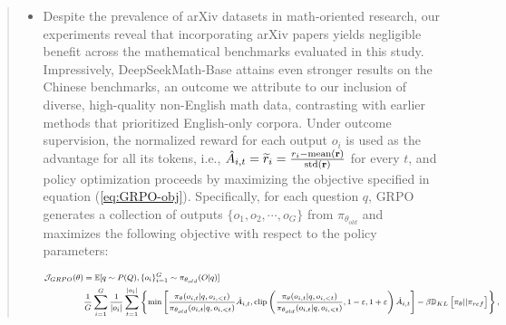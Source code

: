 \begin{abstract}
\begin{itemize}[topsep=0pt]
\begin{itemize}[topsep=0pt]
\subsubsection{Towards a Unified Framework} This section proposes a common framework for comparing various training approaches—including SFT, RFT, DPO, PPO, and GRPO—and presents empirical findings on critical factors shaping this framework. \item Despite the prevalence of arXiv datasets in math-oriented research, our experiments reveal that incorporating arXiv papers yields negligible benefit across the mathematical benchmarks evaluated in this study. Impressively, DeepSeekMath-Base attains even stronger results on the Chinese benchmarks, an outcome we attribute to our inclusion of diverse, high-quality non-English math data, contrasting with earlier methods \citep{minerva,llemma} that prioritized English-only corpora. Under outcome supervision, the normalized reward for each output $o_i$ is used as the advantage for all its tokens, i.e., $\hat{A}_{i, t} = \widetilde{r}_i = \frac{r_i- {\rm mean}(\mathbf{r})}{{\rm std}(\mathbf{r})}$ for every $t$, and policy optimization proceeds by maximizing the objective specified in equation (\ref{eq:GRPO-obj}). Specifically, for each question $q$, GRPO generates a collection of outputs $\{o_1, o_2, \cdots, o_G\}$ from $\pi_{\theta_{old}}$ and maximizes the following objective with respect to the policy parameters:

\begin{equation}
\footnotesize
\begin{split}
    \mathcal{J}_{GRPO}(\theta) &= \mathbb{E}{[q \sim P(Q), \{o_i\}_{i=1}^G \sim \pi_{\theta_{old}}(O|q)]}  \\
    & \frac{1}{G}\sum_{i=1}^G\frac{1}{|o_i|} \sum_{t=1}^{|o_i|} \left\{ \min \left[ \frac{\pi_\theta(o_{i,t} | q, o_{i,<t})}{\pi_{\theta_{old}}(o_{i,t} | q, o_{i,<t})} \hat{A}_{i,t}, \text{clip} \left( \frac{\pi_\theta(o_{i,t} | q, o_{i,<t})}{\pi_{\theta_{old}}(o_{i,t} | q, o_{i,<t})}, 1 - \varepsilon, 1 + \varepsilon \right)  \hat{A}_{i,t} \right] - \beta \mathbb{D}_{KL}\left[\pi_{\theta} || \pi_{ref}\right]\right\} ,
\end{split}
\label{eq:GRPO-obj}
\end{equation}


\end{itemize}
\end{itemize}
\end{abstract}
